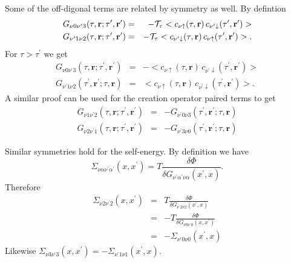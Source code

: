 Some of the off-digonal terms are related by symmetry as well.
By defintion
\begin{eqnarray}
G_{\nu 0 \nu^{\prime}3}(\tau,\mathbf{r};\tau^{\prime}, \mathbf{r}^{\prime}) & = &
-{\cal T}_{\tau} <c_{\nu\uparrow}(\tau,\mathbf{r})\,
c_{\nu^{\prime}\downarrow}(\tau^{\prime},\mathbf{r}^{\prime})> \\
G_{\nu^{\prime}1\nu 2}(\tau,\mathbf{r}; \tau^{\prime},\mathbf{r}^{\prime}) & = &
-{\cal T}_{\tau} <c_{\nu^{\prime}\downarrow}(\tau,\mathbf{r})\,
c_{\nu \uparrow}(\tau^{\prime},\mathbf{r}^{\prime})>.
\end{eqnarray}
For $\tau > \tau^{\prime}$ we get
\begin{eqnarray}
G_{\nu 0 \nu^{\prime}3}(\tau,\mathbf{r}; \tau^{\prime},\mathbf{r}^{\prime}) & = &
- <c_{\nu\uparrow}(\tau,\mathbf{r})\,
c_{\nu^{\prime}\downarrow}(\tau^{\prime},\mathbf{r}^{\prime})> \\
G_{\nu^{\prime}1\nu 2}(\tau^{\prime},\mathbf{r}^{\prime};\tau, \mathbf{r}) & = &
<c_{\nu\uparrow}(\tau,\mathbf{r})\,
c_{\nu^{\prime}\downarrow}(\tau^{\prime},\mathbf{r}^{\prime})>.
\end{eqnarray}
A similar proof can be used for the creation operator paired
terms to get
\begin{eqnarray}
G_{\nu 1 \nu^{\prime}2}(\tau,\mathbf{r}; \tau^{\prime},\mathbf{r}^{\prime}) & = &
- G_{\nu^{\prime}0\nu 3}(\tau^{\prime},\mathbf{r}^{\prime}; \tau,\mathbf{r}) \\
G_{\nu 2 \nu^{\prime}1}(\tau,\mathbf{r};\tau^{\prime}, \mathbf{r}^{\prime}) & = &
- G_{\nu^{\prime}3\nu 0}(\tau^{\prime},\mathbf{r}^{\prime};\tau, \mathbf{r})
\end{eqnarray}

Similar symmetries hold for the self-energy.
By definition we have
\begin{equation}
\Sigma_{\nu\alpha\nu^{\prime}\alpha^{\prime}}(x,x^{\prime}) = T 
\frac{\delta \Phi}{\delta G_{\nu^{\prime}\alpha^{\prime}\nu\alpha}(x^{\prime},x)}.
\end{equation}
Therefore
\begin{eqnarray}
\Sigma_{\nu 2 \nu^{\prime}2}(x,x^{\prime}) & = & T 
\frac{\delta \Phi}{\delta G_{\nu^{\prime}2\nu 2}(x^{\prime},x)} \\
& = & -T 
\frac{\delta \Phi}{\delta G_{\nu 0 \nu^{\prime}0}(x,x^{\prime})} \\
& = & -\Sigma_{\nu^{\prime}0\nu 0}(x^{\prime},x)
\end{eqnarray}
Likewise $\Sigma_{\nu 3 \nu^{\prime}3}(x,x^{\prime}) = 
-\Sigma_{\nu^{\prime} 1 \nu 1}(x^{\prime},x)$.

